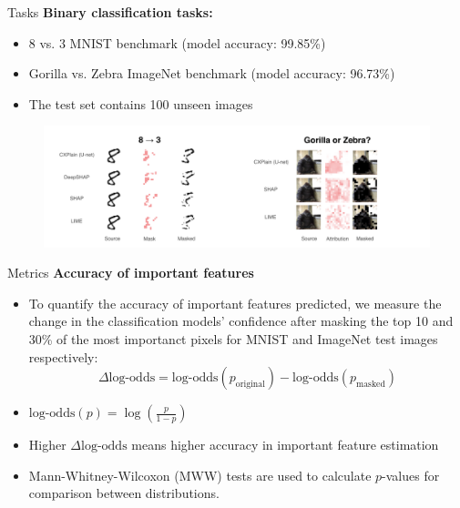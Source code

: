 \documentclass[10pt]{beamer}
\begin{document}
\begin{frame}{Tasks}
\textbf{Binary classification tasks:}
\begin{itemize}
\item 8 vs. 3 MNIST benchmark (model accuracy: 99.85\%)
\item Gorilla vs. Zebra ImageNet benchmark (model accuracy: 96.73\%)
\item The test set contains 100 unseen images
\end{itemize}
\begin{figure}
\centering
\includegraphics[width=\textwidth]{figures/experiment/tasks.png}
\end{figure}
\end{frame}

\begin{frame}{Metrics}
\textbf{Accuracy of important features}
\begin{itemize}
\item To quantify the accuracy of important features predicted, we measure the change in the classification models' confidence after masking the top 10 and 30\% of the most importanct pixels for MNIST and ImageNet test images respectively:
\begin{equation}
\Delta\text{log-odds} = \text{log-odds}(p_{\text{original}}) - \text{log-odds}(p_{\text{masked}})
\end{equation}
\item $\text{log-odds}(p) = \log\left(\frac{p}{1-p}\right)$
\item Higher $\Delta\text{log-odds}$ means higher accuracy in important feature estimation
\item Mann-Whitney-Wilcoxon (MWW) tests are used to calculate $p$-values for comparison between distributions.
\end{itemize}
\end{frame}
\end{document}
